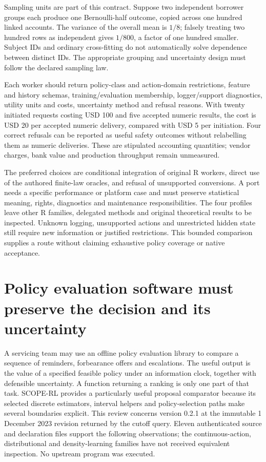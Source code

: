 Sampling units are part of this contract. Suppose two independent borrower groups
each produce one Bernoulli-half outcome, copied across one hundred linked accounts.
The variance of the overall mean is $1/8$; falsely treating two hundred rows as
independent gives $1/800$, a factor of one hundred smaller. Subject IDs and ordinary
cross-fitting do not automatically solve dependence between distinct IDs. The
appropriate grouping and uncertainty design must follow the declared sampling law.
\citep{exec24_policiesr_reference}

Each worker should return policy-class and action-domain restrictions, feature and
history schemas, training/evaluation membership, logger/support diagnostics, utility
units and costs, uncertainty method and refusal reasons. With twenty initiated
requests costing USD 100 and five accepted numeric results, the cost is USD 20 per
accepted numeric delivery, compared with USD 5 per initiation. Four correct refusals
can be reported as useful safety outcomes without relabelling them as numeric
deliveries. These are stipulated accounting quantities; vendor charges, bank value
and production throughput remain unmeasured.~\citep{exec24_policiesr_reference}

The preferred choices are conditional integration of original R workers, direct use
of the authored finite-law oracles, and refusal of unsupported conversions. A port
needs a specific performance or platform case and must preserve statistical meaning,
rights, diagnostics and maintenance responsibilities. The four profiles leave other
R families, delegated methods and original theoretical results to be inspected.
Unknown logging, unsupported actions and unrestricted hidden state still require
new information or justified restrictions. This bounded comparison supplies a route
without claiming exhaustive policy coverage or native acceptance.


\section{Policy evaluation software must preserve the decision and its uncertainty}
\label{exec23:scope-rl-scope}
A servicing team may use an offline policy evaluation library to compare a
sequence of reminders, forbearance offers and escalations. The useful output is
the value of a specified feasible policy under an information clock, together
with defensible uncertainty. A function returning a ranking is only one part of
that task. SCOPE-RL provides a particularly useful proposal comparator because
its selected discrete estimators, interval helpers and policy-selection paths
make several boundaries explicit. This review concerns version 0.2.1 at the
immutable 1 December 2023 revision returned by the cutoff query. Eleven
authenticated source and declaration files support the following observations;
the continuous-action, distributional and density-learning families have not
received equivalent inspection. No upstream program was executed.
\citep{exec23_scope_rl_sources}


